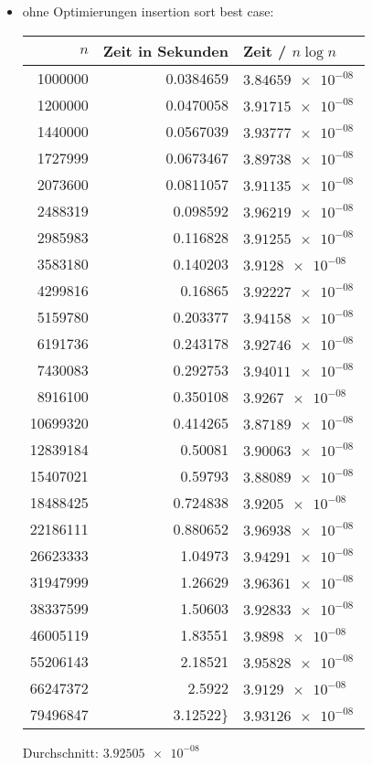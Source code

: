 \documentclass[a4paper]{scrartcl}
\begin{document}
\begin{itemize}
\item ohne Optimierungen
insertion sort best case:
\begin{center}
\begin{tabular}{rrl}
$n$ & Zeit in Sekunden & Zeit / $n\log n$\\
\hline
1000000 & 0.0384659 & $\SI{3.84659e-08}{}$\\
1200000 & 0.0470058 & $\SI{3.91715e-08}{}$\\
1440000 & 0.0567039 & $\SI{3.93777e-08}{}$\\
1727999 & 0.0673467 & $\SI{3.89738e-08}{}$\\
2073600 & 0.0811057 & $\SI{3.91135e-08}{}$\\
2488319 & 0.098592 & $\SI{3.96219e-08}{}$\\
2985983 & 0.116828 & $\SI{3.91255e-08}{}$\\
3583180 & 0.140203 & $\SI{3.9128e-08}{}$\\
4299816 & 0.16865 & $\SI{3.92227e-08}{}$\\
5159780 & 0.203377 & $\SI{3.94158e-08}{}$\\
6191736 & 0.243178 & $\SI{3.92746e-08}{}$\\
7430083 & 0.292753 & $\SI{3.94011e-08}{}$\\
8916100 & 0.350108 & $\SI{3.9267e-08}{}$\\
10699320 & 0.414265 & $\SI{3.87189e-08}{}$\\
12839184 & 0.50081 & $\SI{3.90063e-08}{}$\\
15407021 & 0.59793 & $\SI{3.88089e-08}{}$\\
18488425 & 0.724838 & $\SI{3.9205e-08}{}$\\
22186111 & 0.880652 & $\SI{3.96938e-08}{}$\\
26623333 & 1.04973 & $\SI{3.94291e-08}{}$\\
31947999 & 1.26629 & $\SI{3.96361e-08}{}$\\
38337599 & 1.50603 & $\SI{3.92833e-08}{}$\\
46005119 & 1.83551 & $\SI{3.9898e-08}{}$\\
55206143 & 2.18521 & $\SI{3.95828e-08}{}$\\
66247372 & 2.5922 & $\SI{3.9129e-08}{}$\\
79496847 & 3.12522\} & $\SI{3.93126e-08}{}$\\
\end{tabular}
\end{center}
Durchschnitt: $\SI{3.92505e-08}{}$


\end{itemize}
\end{document}
